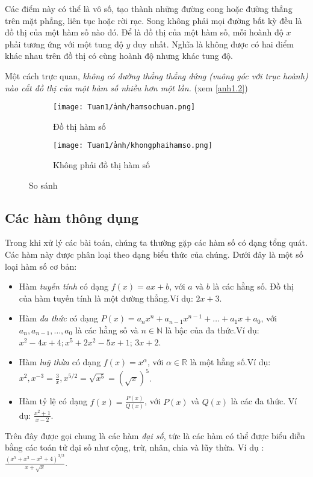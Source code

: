 Các điểm này có thể là vô số, tạo thành những đường cong hoặc đường thẳng trên mặt phẳng, liên tục hoặc rời rạc. Song không phải mọi đường bất kỳ đều là đồ thị của một hàm số nào đó. Để là đồ thị của một hàm số, mỗi hoành độ $x$ phải tương ứng với một tung độ $y$ duy nhất. Nghĩa là không được có hai điểm khác nhau trên đồ thị có cùng hoành độ nhưng khác tung độ.

Một cách trực quan,\emph{ không có đường thẳng thẳng đứng (vuông góc với trục hoành) nào cắt đồ thị của một hàm số nhiều hơn một lần.} (xem \ref{anh1.2})
\begin{figure}[htbp]
    \centering
    \begin{subfigure}{0.4\textwidth}
        \centering
        \texttt{[image: Tuan1/ảnh/hamsochuan.png]}
        \caption{Đồ thị hàm số}
    \end{subfigure}
    \hfill
    \begin{subfigure}{0.5\textwidth}
        \centering
        \texttt{[image: Tuan1/ảnh/khongphaihamso.png]}
        \caption{Không phải đồ thị hàm số}
    \end{subfigure}
    \caption{So sánh}\label{anh1.3}
    \end{figure}

\subsection{Các hàm thông dụng}

Trong khi xử lý các bài toán, chúng ta thường gặp các hàm số có dạng tổng quát. Các hàm này được phân loại theo dạng biểu thức của chúng. Dưới đây là một số loại hàm số cơ bản:   \begin{itemize}
    \item Hàm \emph{tuyến tính} có dạng $f(x) = ax + b$, với $a$ và $b$ là các hằng số. Đồ thị của hàm tuyến tính là một đường thẳng.\newline Ví dụ: $ 2x+3$.
    \item Hàm \emph{đa thức} có dạng $P(x) = a_n x^n + a_{n-1} x^{n-1} + \ldots + a_1 x + a_0$, với $a_n, a_{n-1}, \ldots, a_0$ là các hằng số và $n\in\mathbb{N}$ là bậc của đa thức.\newline Ví dụ: $x^2 - 4x + 4; x^5 + 2x^2 - 5x + 1$; $3x+2$.
    \item Hàm \emph{luỹ thừa} có dạng $f(x)=x^\alpha$, với $\alpha\in\mathbb{R}$ là một hằng số.\newline Ví dụ: $x^2, x^{-3}=\frac{3}{x}, x^{5/2}=\sqrt{x^5}=(\sqrt x)^5$.     
    \item Hàm tỷ lệ có dạng $f(x) = \frac{P(x)}{Q(x)}$, với $P(x)$ và $Q(x)$ là các đa thức. Ví dụ: $\frac{x^2+1}{x-2}$.    
\end{itemize}
Trên đây được gọi chung là các hàm \emph{đại số}, tức là các hàm có thể được biểu diễn bằng các toán tử đại số như cộng, trừ, nhân, chia và lũy thừa.\newline
Ví dụ : $\frac{\left(x^5+x^3-x^2+4\right)^{3/2}}{x+\sqrt x}$.
\vspace{8pt}

